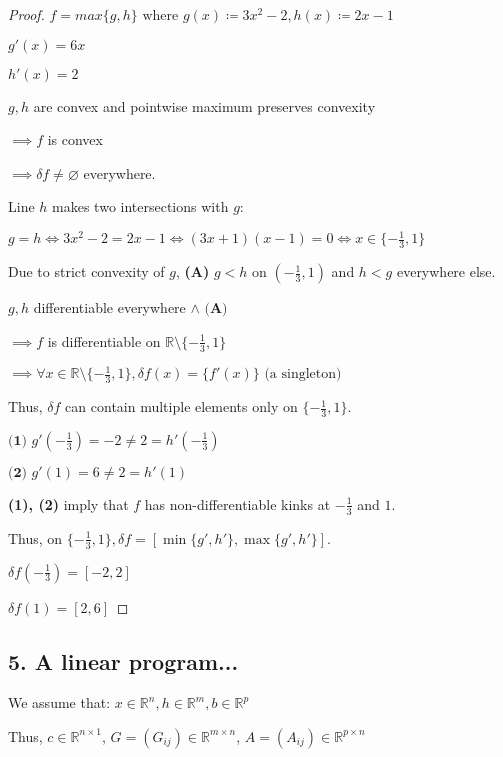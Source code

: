 \documentclass[a4paper,10pt]{article}
\theoremstyle{definition}
\begin{document}
\begin{proof}

$f = max\{g, h\} \text{ where } g(x) \coloneq 3x^2 - 2, h(x) \coloneq 2x - 1$

$g'(x) = 6x$

$h'(x) = 2$

$g,h$ are convex and pointwise maximum preserves convexity

$\implies f$ is convex

$\implies \delta f \neq \varnothing$ everywhere.

Line $h$ makes two intersections with $g$:

$g = h \iff 3x^2 - 2 = 2x - 1 \iff (3x + 1)(x - 1) = 0 \iff x \in \{-\frac{1}{3}, 1\}$

Due to strict convexity of $g$, \textbf{(A)} $g < h$ on $(-\frac{1}{3}, 1)$ and $h < g$ everywhere else.

$g, h$ differentiable everywhere $\land \textbf{ (A)}$

$\implies f$ is differentiable on $\mathbb{R} \setminus \{-\frac{1}{3}, 1\}$

$\implies \forall x \in \mathbb{R} \setminus \{-\frac{1}{3}, 1\}, \delta f(x) = \{f'(x)\} \text{ (a singleton)}$

Thus, $\delta f$ can contain multiple elements only on $\{-\frac{1}{3}, 1\}$.

$\textbf{(1) } g'(-\frac{1}{3}) = -2 \neq 2 = h'(-\frac{1}{3})$

$\textbf{(2) } g'(1) = 6 \neq 2 = h'(1)$

\textbf{(1), (2)} imply that $f$ has non-differentiable kinks at $-\frac{1}{3}$ and $1$.

Thus, on $\{-\frac{1}{3}, 1\}, \delta f = [\min\{g', h'\},\max\{g', h'\}]$.

$\delta f(-\frac{1}{3}) = [-2, 2]$

$\delta f(1) = [2, 6]$

\end{proof}


\bigskip
\subsection*{5. A linear program...}

We assume that:
$x \in \mathbb{R}^n, h \in \mathbb{R}^m, b \in \mathbb{R}^p$

Thus, $c \in \mathbb{R}^{n \times 1}$, $G = (G_{ij}) \in \mathbb{R}^{m \times n}$, $A = (A_{ij}) \in \mathbb{R}^{p \times n}$
\end{document}
